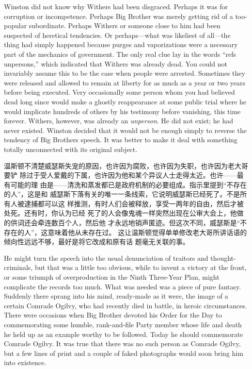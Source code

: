 \begin{paracol}{2}
Winston did not know why Withers had been disgraced. Perhaps it was for
corruption or incompetence. Perhaps Big Brother was merely getting rid
of a too-popular subordinate. Perhaps Withers or someone close to him
had been suspected of heretical tendencies. Or perhaps---what was
likeliest of all---the thing had simply happened because purges and
vaporizations were a necessary part of the mechanics of government. The
only real clue lay in the words ``refs unpersons,'' which indicated that
Withers was already dead. You could not invariably assume this to be the
case when people were arrested. Sometimes they were released and allowed
to remain at liberty for as much as a year or two years before being
executed. Very occasionally some person whom you had believed dead long
since would make a ghostly reappearance at some public trial where he
would implicate hundreds of others by his testimony before vanishing,
this time forever. Withers, however, was already an \emph{unperson}. He
did not exist; he had never existed. Winston decided that it would not
be enough simply to reverse the tendency of Big
Brother\textquotesingle s speech. It was better to make it deal with
something totally unconnected with its original subject.

\switchcolumn

温斯顿不清楚威瑟斯失宠的原因，也许因为腐败，也许因为失职，也许因为老大哥要铲
除过于受人爱戴的下属，也许因为他和某个异议人士走得太近。也许——最有可能的理
由是——清洗和蒸发都已是政府机制的必要组成。指示里提到``不存在的人''，这是和
威瑟斯下落有关的唯一一条线索，它说明威瑟斯已经死了。不是所有人被逮捕都可以这
样推测，有时人们会被释放，享受一两年的自由，然后才被处死。还有时，你认为已经
死了的人会像鬼魂一样突然出现在公审大会上，他做的供词还会牵连数百个人，然后他
才永远地销声匿迹。但这次不同，威瑟斯是``不存在的人''，这意味着他从未存在过。
这让温斯顿觉得单单修改老大哥所讲话语的倾向性远远不够，最好是将它改成和原有话
题毫无关联的事。

\switchcolumn*

He might turn the speech into the usual denunciation of traitors and
thought-criminals, but that was a little too obvious, while to invent a
victory at the front, or some triumph of overproduction in the Ninth
Three-Year Plan, might complicate the records too much. What was needed
was a piece of pure fantasy. Suddenly there sprang into his mind,
ready-made as it were, the image of a certain Comrade Ogilvy, who had
recently died in battle, in heroic circumstances. There were occasions
when Big Brother devoted his Order for the Day to commemorating some
humble, rank-and-file Party member whose life and death he held up as an
example worthy to be followed. Today he should commemorate Comrade
Ogilvy. It was true that there was no such person as Comrade Ogilvy, but
a few lines of print and a couple of faked photographs would soon bring
him into existence.


\end{paracol}
